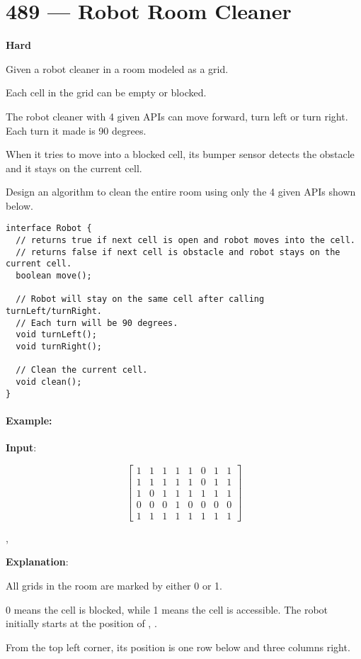 \section{489 --- Robot Room Cleaner}

\textbf{Hard}

Given a robot cleaner in a room modeled as a grid.

Each cell in the grid can be empty or blocked.

The robot cleaner with 4 given APIs can move forward, turn left or turn right. Each turn it made is 90 degrees.

When it tries to move into a blocked cell, its bumper sensor detects the obstacle and it stays on the current cell.

Design an algorithm to clean the entire room using only the 4 given APIs shown below.

\begin{lstlisting}[style=customc]
interface Robot {
  // returns true if next cell is open and robot moves into the cell.
  // returns false if next cell is obstacle and robot stays on the current cell.
  boolean move();

  // Robot will stay on the same cell after calling turnLeft/turnRight.
  // Each turn will be 90 degrees.
  void turnLeft();
  void turnRight();

  // Clean the current cell.
  void clean();
}
\end{lstlisting}

\paragraph{Example:}

\textbf{Input}:

\begin{flushleft}

\[
\begin{bmatrix}
1 & 1 & 1 & 1 & 1 & 0 & 1 & 1\\ 
1 & 1 & 1 & 1 & 1 & 0 & 1 & 1\\ 
1 & 0 & 1 & 1 & 1 & 1 & 1 & 1\\ 
0 & 0 & 0 & 1 & 0 & 0 & 0 & 0\\ 
1 & 1 & 1 & 1 & 1 & 1 & 1 & 1
\end{bmatrix}
\]

,



\textbf{Explanation}:

All grids in the room are marked by either 0 or 1.

0 means the cell is blocked, while 1 means the cell is accessible.
The robot initially starts at the position of , .

From the top left corner, its position is one row below and three columns right.
\end{flushleft}


